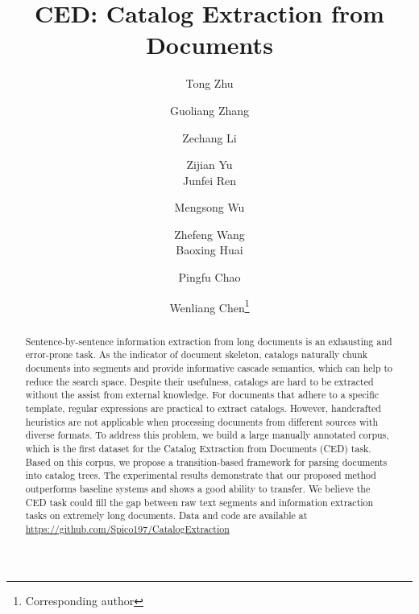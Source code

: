 \documentclass[runningheads]{llncs}
\begin{document}
\title{CED: Catalog Extraction from Documents}
\author{
    Tong Zhu \and
    Guoliang Zhang \and
    Zechang Li \and
    Zijian Yu \\
    Junfei Ren \and
    Mengsong Wu \and
    Zhefeng Wang \\
    Baoxing Huai \and
    Pingfu Chao \and
    Wenliang Chen\thanks{Corresponding author}
}
\maketitle              

\begin{abstract}
Sentence-by-sentence information extraction from long documents is an exhausting and error-prone task.
As the indicator of document skeleton, catalogs naturally chunk documents into segments and provide informative cascade semantics, which can help to reduce the search space.
Despite their usefulness, catalogs are hard to be extracted without the assist from external knowledge.
For documents that adhere to a specific template, regular expressions are practical to extract catalogs.
However, handcrafted heuristics are not applicable when processing documents from different sources with diverse formats.
To address this problem, we build a large manually annotated corpus, which is the first dataset for the Catalog Extraction from Documents (CED) task.
Based on this corpus, we propose a transition-based framework for parsing documents into catalog trees.
The experimental results demonstrate that our proposed method outperforms baseline systems and shows a good ability to transfer.
We believe the CED task could fill the gap between raw text segments and information extraction tasks on extremely long documents.
Data and code are available at \url{https://github.com/Spico197/CatalogExtraction}





\end{abstract}
\end{document}
